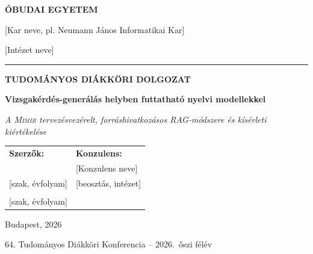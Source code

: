 \documentclass[12pt,a4paper,oneside]{report}
\newcommand{\Kar}{[Kar neve, pl. Neumann János Informatikai Kar]}
\newcommand{\Intezet}{[Intézet neve]}
\newcommand{\SzerzoA}{[Szerző 1 neve]}
\newcommand{\SzerzoAszak}{[szak, évfolyam]}
\newcommand{\SzerzoB}{[Szerző 2 neve]}
\newcommand{\SzerzoBszak}{[szak, évfolyam]}
\newcommand{\Konzulens}{[Konzulens neve]}
\newcommand{\KonzulensBeosztas}{[beosztás, intézet]}
\newcommand{\Ev}{2026}
\newcommand{\DolgozatCim}{Vizsgakérdés-generálás helyben futtatható nyelvi modellekkel}
\newcommand{\DolgozatAlcim}{A \textsc{Mimir} tervezésvezérelt, forráshivatkozásos RAG-módszere és kísérleti kiértékelése}
\newcommand{\1}{\mathbb{1}}
\theoremstyle{definition}
\theoremstyle{remark}
\begin{document}
\begin{titlepage}
\begin{center}
\begin{singlespace}
{\Large\bfseries ÓBUDAI EGYETEM\par}
\vspace{2mm}
{\large \Kar\par}
{\normalsize \Intezet\par}
\vspace{2mm}
\rule{\textwidth}{0.6pt}\par
\vspace{2.8cm}
{\LARGE\bfseries TUDOMÁNYOS DIÁKKÖRI DOLGOZAT\par}
\vspace{2.2cm}
{\Large\bfseries \DolgozatCim\par}
\vspace{6mm}
{\large\itshape \DolgozatAlcim\par}
\vfill
\begin{tabular}{@{}p{}p{}@{}}
\textbf{Szerzők:} & \textbf{Konzulens:}\\[1mm]
\SzerzoA & \Konzulens\\
\small\SzerzoAszak & \small\KonzulensBeosztas\\[3mm]
\SzerzoB & \\
\small\SzerzoBszak & \\
\end{tabular}
\vspace{2.4cm}

{\large Budapest, \Ev\par}
\vspace{2mm}
{\small 64. Tudományos Diákköri Konferencia -- \Ev.\ őszi félév\par}
\end{singlespace}
\end{center}
\end{titlepage}

\setcounter{page}{2}


\cleardoublepage
{}
{}
\begin{singlespace}
\tableofcontents
\end{singlespace}



\cleardoublepage
{}
\setcounter{page}{1}
\end{document}
